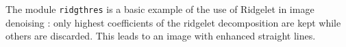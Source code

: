 The module {\tt ridgthres} is a basic example of the use of Ridgelet in image
denoising : only highest coefficients of the ridgelet decomposition are kept
while others are discarded. This leads to an image with enhanced straight lines.
